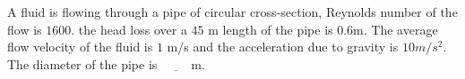 \iffalse
\chapter{2014}
\author{AI24BTECH11027}
\section{xe}
\fi

\item A fluid is flowing through a pipe of circular cross-section, Reynolds number of the flow is $1600$. the head loss over a $45$ m length of the pipe is $0.6 $m. The average flow velocity of the fluid is $1$ m/s and the acceleration due to gravity is $10 m/s^2$. The diameter of the pipe is $\underline{\hspace{1cm}}$m.\\

